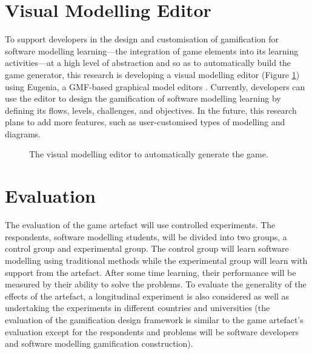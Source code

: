 \documentclass[runningheads,a4paper]{llncs}
\begin{document}
\section{Visual Modelling Editor}
To support developers in the design and customisation of gamification for software modelling learning---the integration of game elements into its learning activities---at a high level of abstraction and so as to automatically build the game generator, this research is developing a visual modelling editor (Figure \ref{fig:002}) using Eugenia, a GMF-based graphical model editors \cite{kolovos2015eugenia}. Currently, developers can use the editor to design the gamification of software modelling learning by defining its flows, levels, challenges, and objectives. In the future, this research plans to add more features, such as user-customised types of modelling and diagrams. 

\begin{figure}[t]
\centering
{}
\caption{The visual modelling editor to automatically generate the game.}
\label{fig:002}
\end{figure}

\section{Evaluation}
The evaluation of the game artefact will use controlled experiments. The respondents, software modelling students, will be divided into two groups, a control group and experimental group. The control group will learn software modelling using traditional methods while the experimental group will learn with support from the artefact. After some time learning, their performance will be measured by their ability to solve the problems. To evaluate the generality of the effects of the artefact, a longitudinal experiment is also considered as well as undertaking the experiments in different countries and universities (the evaluation of the gamification design framework is similar to the game artefact's evaluation except for the respondents and problems will be software developers and software modelling gamification construction).
\end{document}
